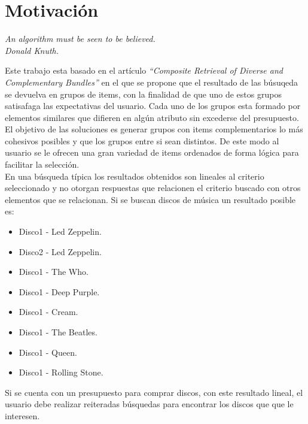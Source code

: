 \section{Motivación}
{\begin{small}%
\begin{flushright}%
\it An algorithm must be seen to be believed.\\Donald Knuth.
\end{flushright}%
\end{small}%
\vspace{.5cm}}
Este trabajo esta basado en el artículo \textit{\textquotedblleft Composite Retrieval of Diverse 
and Complementary Bundles\textquotedblright}\cite{compositeRetrival} en el que se propone 
que el resultado de las búsuqeda se devuelva en grupos de items, con la finalidad de que uno de estos grupos satisafaga
las expectativas del usuario. Cada uno de los grupos esta formado por elementos similares que difieren en algún atributo sin excederse del presupuesto.
El objetivo de las soluciones es generar grupos con items complementarios lo más cohesivos posibles y que los grupos entre si sean distintos.
De este modo al usuario se le ofrecen una gran variedad de items ordenados de forma lógica para facilitar la selección.\\

En una búsqueda típica los resultados obtenidos son lineales al criterio seleccionado y no otorgan respuestas que relacionen 
el criterio buscado con otros elementos que se relacionan. Si se buscan discos de música un resultado posible es:\\
\begin{itemize}
  \item Disco1 - Led Zeppelin.
  \item Disco2 - Led Zeppelin.
  \item Disco1 - The Who.
  \item Disco1 - Deep Purple.
  \item Disco1 - Cream.
  \item Disco1 - The Beatles.
  \item Disco1 - Queen.
  \item Disco1 - Rolling Stone.
\end{itemize}

Si se cuenta con un presupuesto para comprar discos, con este resultado lineal, el usuario debe realizar reiteradas búsquedas para 
encontrar los discos que que le interesen.\\

